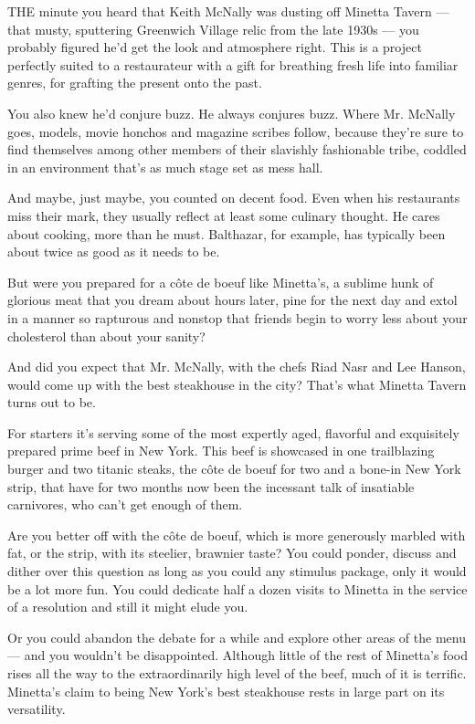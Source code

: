 THE minute you heard that Keith McNally was dusting off Minetta Tavern
--- that musty, sputtering Greenwich Village relic from the late 1930s
--- you probably figured he'd get the look and atmosphere right. This is
a project perfectly suited to a restaurateur with a gift for breathing
fresh life into familiar genres, for grafting the present onto the past.

You also knew he'd conjure buzz. He always conjures buzz. Where Mr.
McNally goes, models, movie honchos and magazine scribes follow, because
they're sure to find themselves among other members of their slavishly
fashionable tribe, coddled in an environment that's as much stage set as
mess hall.

And maybe, just maybe, you counted on decent food. Even when his
restaurants miss their mark, they usually reflect at least some culinary
thought. He cares about cooking, more than he must. Balthazar, for
example, has typically been about twice as good as it needs to be.

But were you prepared for a côte de boeuf like Minetta's, a sublime hunk
of glorious meat that you dream about hours later, pine for the next day
and extol in a manner so rapturous and nonstop that friends begin to
worry less about your cholesterol than about your sanity?

And did you expect that Mr. McNally, with the chefs Riad Nasr and Lee
Hanson, would come up with the best steakhouse in the city? That's what
Minetta Tavern turns out to be.

For starters it's serving some of the most expertly aged, flavorful and
exquisitely prepared prime beef in New York. This beef is showcased in
one trailblazing burger and two titanic steaks, the côte de boeuf for
two and a bone-in New York strip, that have for two months now been the
incessant talk of insatiable carnivores, who can't get enough of them.

Are you better off with the côte de boeuf, which is more generously
marbled with fat, or the strip, with its steelier, brawnier taste? You
could ponder, discuss and dither over this question as long as you could
any stimulus package, only it would be a lot more fun. You could
dedicate half a dozen visits to Minetta in the service of a resolution
and still it might elude you.

Or you could abandon the debate for a while and explore other areas of
the menu --- and you wouldn't be disappointed. Although little of the
rest of Minetta's food rises all the way to the extraordinarily high
level of the beef, much of it is terrific. Minetta's claim to being New
York's best steakhouse rests in large part on its versatility.

